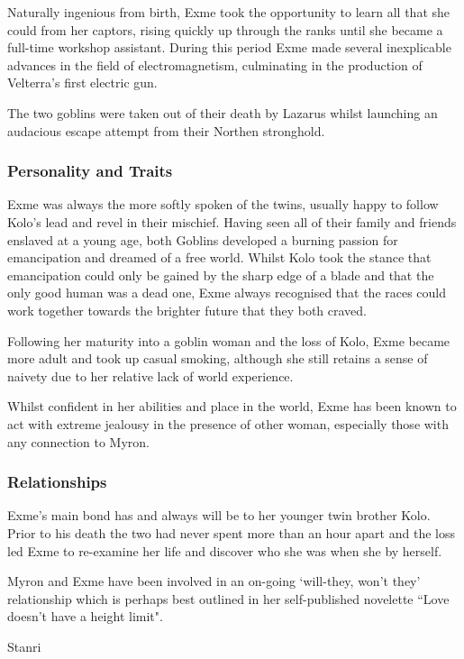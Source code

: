Naturally ingenious from birth, Exme took the opportunity to learn all that she could from her captors, rising quickly up through the ranks until she became a full-time workshop assistant.  During this period Exme made several inexplicable advances in the field of electromagnetism, culminating in the production of Velterra's first electric gun.  

The two goblins were taken out of their death by Lazarus whilst launching an audacious escape attempt from their Northen stronghold.  

\subsubsection{Personality and Traits}

Exme was always the more softly spoken of the twins, usually happy to follow Kolo's lead and revel in their mischief.  Having seen all of their family and friends enslaved at a young age, both Goblins developed a burning passion for emancipation and dreamed of a free world.  Whilst Kolo took the stance that emancipation could only be gained by the sharp edge of a blade and that the only good human was a dead one, Exme always recognised that the races could work together towards the brighter future that they both craved.  

Following her maturity into a goblin woman and the loss of Kolo, Exme became more adult and took up casual smoking, although she still retains a sense of naivety due to her relative lack of world experience.   

Whilst confident in her abilities and place in the world, Exme has been known to act with extreme jealousy in the presence of other woman, especially those with any connection to Myron.  

\subsubsection{Relationships}

Exme's main bond has and always will be to her younger twin brother Kolo.  Prior to his death the two had never spent more than an hour apart and the loss led Exme to re-examine her life and discover who she was when she by herself.  

Myron and Exme have been involved in an on-going `will-they, won't they' relationship which is perhaps best outlined in her self-published novelette ``Love doesn't have a height limit".  

Stanri 

